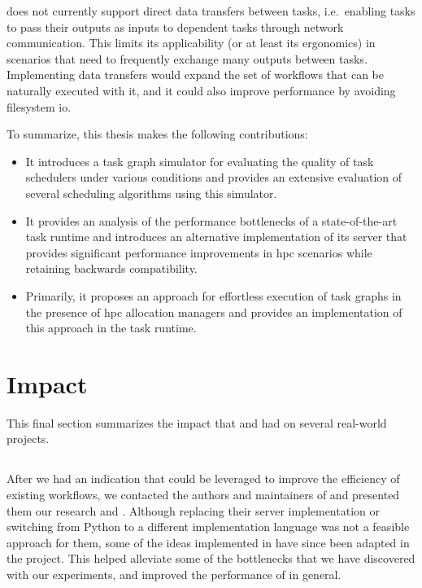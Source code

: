 \begin{description}[wide=0pt]
		\hyperqueue{} does not currently support direct data transfers
		between tasks, i.e.\ enabling tasks to pass their outputs as inputs to dependent tasks through
		network communication. This limits its applicability (or at least its ergonomics) in scenarios that
		need to frequently exchange many outputs between tasks. Implementing data transfers would expand
		the set of workflows that can be naturally executed with it, and it could also improve performance
		by avoiding filesystem \gls{io}.
\end{description}

To summarize, this thesis makes the following contributions:
\begin{itemize}
	\item It introduces a task graph simulator for evaluating the quality of task schedulers under various
	      conditions and provides an extensive evaluation of several scheduling algorithms using this
	      simulator.
	\item It provides an analysis of the performance bottlenecks of a state-of-the-art task runtime
	      \dask{} and introduces an alternative implementation of its server that provides
	      significant performance improvements in \gls{hpc} scenarios while retaining
	      backwards compatibility.
	\item Primarily, it proposes an approach for effortless execution of task graphs in the presence of
	      \gls{hpc} allocation managers and provides an implementation of this approach in
	      the \hyperqueue{} task runtime.
\end{itemize}

\section{Impact}
This final section summarizes the impact that \rsds{} and
\hyperqueue{} had on several real-world projects.

\subsection*{\rsds{}}
After we had an indication that \rsds{} could be leveraged to improve the
efficiency of existing \dask{} workflows, we contacted the authors and
maintainers of \dask{} and presented them our research and
\rsds{}. Although replacing their server implementation or switching from Python
to a different implementation language was not a feasible approach for them, some of the ideas
implemented in \rsds{} have since been adapted in the \dask{}
project. This helped alleviate some of the bottlenecks that we have discovered with our
experiments, and improved the performance of \dask{} in
general.

